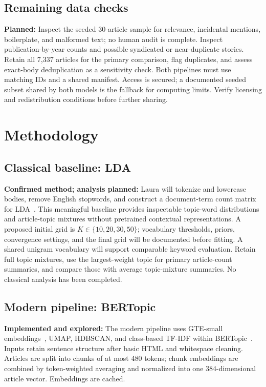 \documentclass[conference]{IEEEtran}
\begin{document}
\subsection{Remaining data checks}
\textbf{Planned:} Inspect the seeded 30-article sample for relevance, incidental mentions, boilerplate, and malformed text; no human audit is complete. Inspect publication-by-year counts and possible syndicated or near-duplicate stories. Retain all 7,337 articles for the primary comparison, flag duplicates, and assess exact-body deduplication as a sensitivity check. Both pipelines must use matching IDs and a shared manifest. Access is secured; a documented seeded subset shared by both models is the fallback for computing limits. Verify licensing and redistribution conditions before further sharing.

\section{Methodology}
\subsection{Classical baseline: LDA}
\textbf{Confirmed method; analysis planned:} Laura will tokenize and lowercase bodies, remove English stopwords, and construct a document-term count matrix for LDA~\cite{blei2003}. This meaningful baseline provides inspectable topic-word distributions and article-topic mixtures without pretrained contextual representations. A proposed initial grid is $K\in\{10,20,30,50\}$; vocabulary thresholds, priors, convergence settings, and the final grid will be documented before fitting. A shared unigram vocabulary will support comparable keyword evaluation. Retain full topic mixtures, use the largest-weight topic for primary article-count summaries, and compare those with average topic-mixture summaries. No classical analysis has been completed.

\subsection{Modern pipeline: BERTopic}
\textbf{Implemented and explored:} The modern pipeline uses GTE-small embeddings~\cite{gtemodel}, UMAP, HDBSCAN, and class-based TF-IDF within BERTopic~\cite{bertopicsoftware}. Inputs retain sentence structure after basic HTML and whitespace cleaning. Articles are split into chunks of at most 480 tokens; chunk embeddings are combined by token-weighted averaging and normalized into one 384-dimensional article vector. Embeddings are cached.
\end{document}
